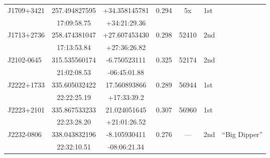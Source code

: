 \begin{table*}
\begin{tabular} {l  cc  cc l l}
\multirow{ 2}{*}{J1709+3421}   & 257.494827595    &  +34.358145781    &\multirow{ 2}{*}{0.294}    & \multirow{ 2}{*}{5x}             &   \multirow{ 2}{*}{1st}     &          \\
                                                 & 17:09:58.75          & +34:21:29.36          &                                      &                                            &             &           \\  
\multirow{ 2}{*}{J1713+2736}   &  258.474381047   &  +27.607453430     &\multirow{ 2}{*}{0.298}   & \multirow{ 2}{*}{52410}      &  \multirow{ 2}{*}{2nd}      & \citet{Sheng2019} \\
                                                 &  17:13:53.84         &  +27:36:26.82         &                                       &                                          &              &      \\  
\multirow{ 2}{*}{J2102-0645}    &  315.535560174    & -6.750523111        &  \multirow{ 2}{*}{0.325} & \multirow{ 2}{*}{52174}     &  \multirow{ 2}{*}{2nd}      &     \\
                                                 &   21:02:08.53        &  -06:45:01.88          &                                      &                                           &              &     \\ 
 \multirow{ 2}{*}{J2222+1733}  &  335.605032422    & 17.560893866        &\multirow{ 2}{*}{0.289}   & \multirow{ 2}{*}{56944}     &   \multirow{ 2}{*}{1st}       &     \\
                                                 & 22:22:25.19          &   +17:33:39.2         &                                       &                                          &               &     \\  
\multirow{ 2}{*}{J2223+2101}   &  335.867533233   &    21.024051645     &\multirow{ 2}{*}{0.307}   & \multirow{ 2}{*}{56960}      &   \multirow{ 2}{*}{1st}      &      \\
                                                 & 22:23:28.20           & +21:01:26.52         &                                       &                                          &              &      \\  
\multirow{ 2}{*}{J2232-0806}    &   338.043832196  &  -8.105930411       &\multirow{ 2}{*}{0.276}      & \multirow{ 2}{*}{---}      &   \multirow{ 2}{*}{2nd}     & ``Big Dipper''  \\
                                                 &   22:32:10.51        &  -08:06:21.34          &                                      &                                          &              &  \citet{Kynoch2019}      \\ 

\end{tabular}
\end{table*}
